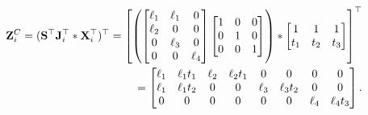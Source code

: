 \documentclass[12pt]{article}
\begin{document}
\begin{equation}
\begin{aligned}
{\mathbf Z}^{C}_{i} = ({\mathbf S}^{\top}{\mathbf J}^{\top}_{i} \ast {\mathbf X}^{\top}_{i})^{\top} =
\left[
\left(
\begin{bmatrix}
\ell_{1} & \ell_{1}  & 0 \\
\ell_{2} &  0  & 0 \\
0  &  \ell_{3} & 0 \\
0 & 0 &  \ell_{4} 
\end{bmatrix}
\begin{bmatrix}
1 & 0  & 0 \\
0 & 1  & 0 \\
0 & 0  & 1  
\end{bmatrix}
\right)
\ast
\begin{bmatrix}
1   & 1   & 1  \\ 
t_1 & t_2 & t_3
\end{bmatrix} 
\right]^{\top}
\\
= \begin{bmatrix}
\ell_{1} & \ell_{1}t_1 & \ell_{2} & \ell_{2}t_1 & 0 & 0 & 0 & 0 \\
\ell_{1} & \ell_{1}t_2 & 0 & 0 & \ell_{3} & \ell_{3}t_2 & 0 & 0 \\
0 & 0 & 0 & 0 & 0 & 0 & \ell_{4} & \ell_{4}t_3
\end{bmatrix}.
\end{aligned}
\end{equation}


% 
% 
\end{document}
